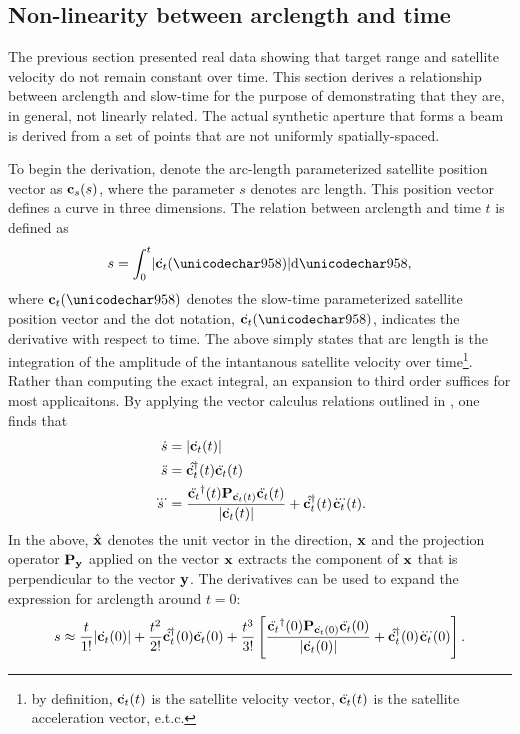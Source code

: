 \subsection{Non-linearity between arclength and time}
The previous section presented real data showing that target range and satellite velocity do not remain constant over time. This section derives a relationship between arclength and slow-time for the purpose of demonstrating that they are, in general, not linearly related. The actual synthetic aperture that forms a beam is derived from a set of points that are not uniformly spatially-spaced.
\par
To begin the derivation, denote the arc-length parameterized satellite position vector as $\mathbf{c}_s(s)$, where the parameter $s$ denotes arc length. This position vector defines a curve in three dimensions. The relation between arclength and time $t$ is defined as
\begin{equation}
 s=\int_0^t\lvert\dot{\satt}(\xi)\rvert\d{\xi},
\end{equation}
where $\satt(\xi)$ denotes the slow-time parameterized satellite position vector and the dot notation, $\dot{\satt}(\xi)$, indicates the derivative with respect to time. The above simply states that arc length is the integration of the amplitude of the intantanous satellite velocity over time\footnote{by definition, $\dot{\mathbf{c}_t}(t)$ is the satellite velocity vector, $\ddot{\mathbf{c}_t}(t)$ is the satellite acceleration vector, e.t.c.}. Rather than computing the exact integral, an expansion to third order suffices for most applicaitons. By applying the vector calculus relations outlined in , one finds that
\begin{align}
 \dot{s} &= \lvert\dot{\satt}(t)\rvert\\
 \ddot{s} &= \htr{\hat{\dot{\satt}}}(t)\ddot{\satt}(t)\\
 \dddot{s} &= \frac{\htr{\ddot{\satt}}(t)\mtx{P}_{\dot{\satt}(t)}\ddot{\satt}(t)}{\lvert\dot{\satt}(t)\rvert} + \htr{\hat{\dot{\satt}}}(t)\dddot{\satt}(t).
\end{align}
In the above, $\hat{\mathbf{x}}$ denotes the unit vector in the direction, $\mathbf{x}$ and the projection operator $\mtx{P}_{\vct{y}}$ applied on the vector $\mathbf{x}$ extracts the component of $\mathbf{x}$ that is perpendicular to the vector $\mathbf{y}$. The derivatives can be used to
expand the expression for arclength around $t=0$:
\begin{equation}
 s \approx \frac{t}{1!}\lvert\dot{\satt}(0)\rvert + \frac{t^2}{2!}\htr{\hat{\dot{\satt}}}(0)\ddot{\satt}(0) + \frac{t^3}{3!}\left[\frac{\htr{\ddot{\satt}}(0)\mtx{P}_{\dot{\satt}(0)}\ddot{\satt}(0)}{\lvert\dot{\satt}(0)\rvert} + \htr{\hat{\dot{\satt}}}(0)\dddot{\satt}(0)\right].
\end{equation}
